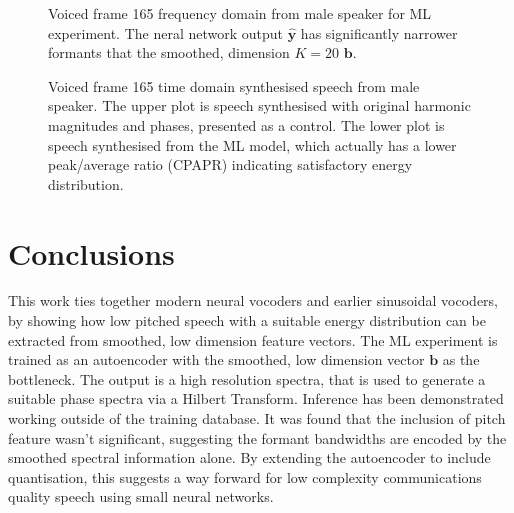 \documentclass{article}
\begin{document}
\begin{figure}
\caption{Voiced frame 165 frequency domain from male speaker for ML experiment. The neral network output $\hat{\mathbf{y}}$ has significantly narrower formants that the smoothed, dimension $K=20$ $\mathbf{b}$.}
\label{fig:big_dog_f165_ml_freq}
\begin{center}

\end{center}
\end{figure}

\begin{figure}
\caption{Voiced frame 165 time domain synthesised speech from male speaker.  The upper plot is speech synthesised with original harmonic magnitudes and phases, presented as a control.  The lower plot is speech synthesised from the ML model, which actually has a lower peak/average ratio (CPAPR) indicating satisfactory energy distribution.}
\label{fig:big_dog_f165_ml_time}
\begin{center}

\end{center}
\end{figure}

\section{Conclusions}

This work ties together modern neural vocoders and earlier sinusoidal vocoders, by showing how low pitched speech with a suitable energy distribution can be extracted from smoothed, low dimension feature vectors.  The ML experiment is trained as an autoencoder with the smoothed, low dimension vector $\mathbf{b}$ as the bottleneck. The output is a high resolution spectra, that is used to generate a suitable phase spectra via a Hilbert Transform. Inference has been demonstrated working outside of the training database. It was found that the inclusion of pitch feature wasn't significant, suggesting the formant bandwidths are encoded by the smoothed spectral information alone. By extending the autoencoder to include quantisation, this suggests a way forward for low complexity communications quality speech using small neural networks.
\end{document}
